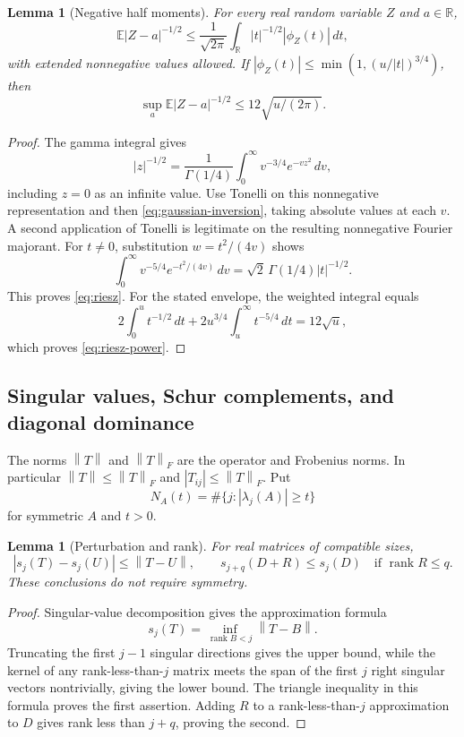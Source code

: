 \documentclass[11pt]{article}
\numberwithin{equation}{section}
\newtheorem{lemma}[theorem]{Lemma}
\theoremstyle{definition}\newtheorem{definition}[theorem]{Definition}
\theoremstyle{remark}\newtheorem{remark}[theorem]{Remark}
\newcommand{\R}{\mathbb R}\newcommand{\E}{\mathbb E}\newcommand{\PP}{\mathbb P}
\newcommand{\1}{\mathbf 1}\newcommand{\diag}{\operatorname{diag}}
\newcommand{\rank}{\operatorname{rank}}\newcommand{\tr}{\operatorname{tr}}
\newcommand{\norm}[1]{\left\lVert#1\right\rVert}\newcommand{\abs}[1]{\left|#1\right|}
\begin{document}
\begin{lemma}[Negative half moments]\label{lem:riesz}
For every real random variable $Z$ and $a\in\R$,
\begin{equation}\label{eq:riesz}
 \E|Z-a|^{-1/2}\le\frac1{\sqrt{2\pi}}
 \int_\R |t|^{-1/2}|\phi_Z(t)|\,dt,
\end{equation}
with extended nonnegative values allowed. If
$|\phi_Z(t)|\le\min(1,(u/|t|)^{3/4})$, then
\begin{equation}\label{eq:riesz-power}
 \sup_a\E|Z-a|^{-1/2}\le12\sqrt{u/(2\pi)}.
\end{equation}
\end{lemma}
\begin{proof}
The gamma integral gives
\[
 |z|^{-1/2}=\frac1{\Gamma(1/4)}\int_0^\infty v^{-3/4}e^{-vz^2}\,dv,
\]
including $z=0$ as an infinite value. Use Tonelli on this nonnegative representation and then \eqref{eq:gaussian-inversion}, taking absolute values at each $v$. A second application of Tonelli is legitimate on the resulting nonnegative Fourier majorant. For $t\ne0$, substitution $w=t^2/(4v)$ shows
\[
 \int_0^\infty v^{-5/4}e^{-t^2/(4v)}\,dv
 =\sqrt2\,\Gamma(1/4)|t|^{-1/2}.
\]
This proves \eqref{eq:riesz}. For the stated envelope, the weighted integral equals
\[
 2\int_0^u t^{-1/2}\,dt+
 2u^{3/4}\int_u^\infty t^{-5/4}\,dt=12\sqrt u,
\]
which proves \eqref{eq:riesz-power}.
\end{proof}

\subsection{Singular values, Schur complements, and diagonal dominance}
The norms $\norm T$ and $\norm T_F$ are the operator and Frobenius norms. In particular $\norm T\le\norm T_F$ and $|T_{ij}|\le\norm T_F$. Put
\[
 N_A(t)=\#\{j:|\lambda_j(A)|\ge t\}
\]
for symmetric $A$ and $t>0$.

\begin{lemma}[Perturbation and rank]\label{lem:rank}
For real matrices of compatible sizes,
\begin{equation}\label{eq:rank-perturb}
 |s_j(T)-s_j(U)|\le\norm{T-U},\qquad
 s_{j+q}(D+R)\le s_j(D)\quad\text{if }\rank R\le q.
\end{equation}
These conclusions do not require symmetry.
\end{lemma}
\begin{proof}
Singular-value decomposition gives the approximation formula
\[s_j(T)=\inf_{\rank B<j}\norm{T-B}.\]
Truncating the first $j-1$ singular directions gives the upper bound, while the kernel of any rank-less-than-$j$ matrix meets the span of the first $j$ right singular vectors nontrivially, giving the lower bound. The triangle inequality in this formula proves the first assertion. Adding $R$ to a rank-less-than-$j$ approximation to $D$ gives rank less than $j+q$, proving the second.
\end{proof}
\end{document}
